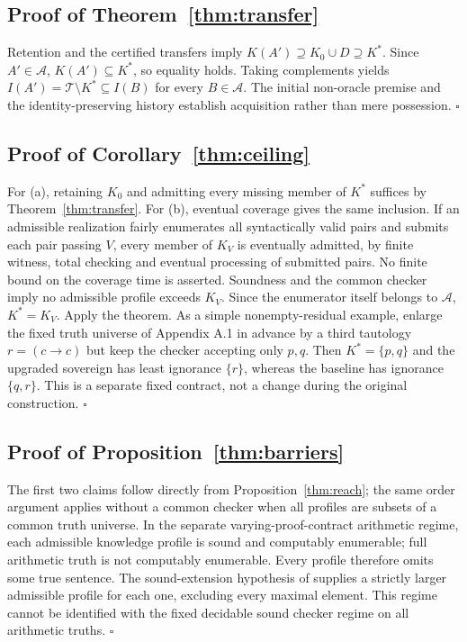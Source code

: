 \documentclass[11pt]{article}
\theoremstyle{definition}\newtheorem{definition}[theorem]{Definition}
\newcommand{\T}{\mathcal T}\newcommand{\A}{\mathcal A}\newcommand{\id}{\operatorname{ID}}\newcommand{\Con}{\operatorname{Con}}\newcommand{\Oracle}{\operatorname{Oracle}}\newcommand{\Btrade}{\mathrm{B11}}
\begin{document}
\subsection{Proof of Theorem~\ref{thm:transfer}}
Retention and the certified transfers imply $K(A')\supseteq K_0\cup D\supseteq K^*$. Since $A'\in\A$, $K(A')\subseteq K^*$, so equality holds. Taking complements yields $I(A')=\T\setminus K^*\subseteq I(B)$ for every $B\in\A$. The initial non-oracle premise and the identity-preserving history establish acquisition rather than mere possession. \hfill$\square$
\subsection{Proof of Corollary~\ref{thm:ceiling}}
For (a), retaining $K_0$ and admitting every missing member of $K^*$ suffices by Theorem~\ref{thm:transfer}. For (b), eventual coverage gives the same inclusion. If an admissible realization fairly enumerates all syntactically valid pairs and submits each pair passing $V$, every member of $K_V$ is eventually admitted, by finite witness, total checking and eventual processing of submitted pairs. No finite bound on the coverage time is asserted. Soundness and the common checker imply no admissible profile exceeds $K_V$. Since the enumerator itself belongs to $\A$, $K^*=K_V$. Apply the theorem. As a simple nonempty-residual example, enlarge the fixed truth universe of Appendix A.1 in advance by a third tautology $r=(c\to c)$ but keep the checker accepting only $p,q$. Then $K^*=\{p,q\}$ and the upgraded sovereign has least ignorance $\{r\}$, whereas the baseline has ignorance $\{q,r\}$. This is a separate fixed contract, not a change during the original construction. \hfill$\square$
\subsection{Proof of Proposition~\ref{thm:barriers}}
The first two claims follow directly from Proposition~\ref{thm:reach}; the same order argument applies without a common checker when all profiles are subsets of a common truth universe. In the separate varying-proof-contract arithmetic regime, each admissible knowledge profile is sound and computably enumerable; full arithmetic truth is not computably enumerable. Every profile therefore omits some true sentence. The sound-extension hypothesis of \cite[Thm.~5.3]{oracle} supplies a strictly larger admissible profile for each one, excluding every maximal element. This regime cannot be identified with the fixed decidable sound checker regime on all arithmetic truths. \hfill$\square$
\end{document}
